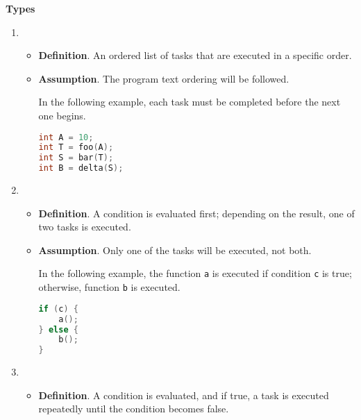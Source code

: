 \highspace
\begin{flushleft}
  \textcolor{Green3}{ \textbf{Types}}
\end{flushleft}
\begin{enumerate}
    \item {}
    \begin{itemize}
        \item[\textcolor{Red2}{\faIcon{book}}] \textcolor{Red2}{\textbf{Definition}}. An ordered list of tasks that are executed in a specific order.

        \item[\textcolor{Green3}{\faIcon{question}}] \textcolor{Green3}{\textbf{Assumption}}. The program text ordering will be followed.
        \begin{examplebox}
            In the following example, each task must be completed before the next one begins.
            \begin{lstlisting}[language=c]
int A = 10;
int T = foo(A);
int S = bar(T);
int B = delta(S);\end{lstlisting}
        \end{examplebox}
    \end{itemize}
  
    \item {}
    \begin{itemize}
        \item[\textcolor{Red2}{\faIcon{book}}] \textcolor{Red2}{\textbf{Definition}}. A condition is evaluated first; depending on the result, one of two tasks is executed.

        \item[\textcolor{Green3}{\faIcon{question}}] \textcolor{Green3}{\textbf{Assumption}}. Only one of the tasks will be executed, not both.
        \begin{examplebox}
            In the following example, the function \texttt{a} is executed if condition \texttt{c} is true; otherwise, function \texttt{b} is executed.
            \begin{lstlisting}[language=c]
if (c) {
    a();
} else {
    b();
}\end{lstlisting}
        \end{examplebox}
    \end{itemize}
  
    \newpage

    \item {}
    \begin{itemize}
        \item[\textcolor{Red2}{\faIcon{book}}] \textcolor{Red2}{\textbf{Definition}}. A condition is evaluated, and if true, a task is executed repeatedly until the condition becomes false.


\end{itemize}
\end{enumerate}
